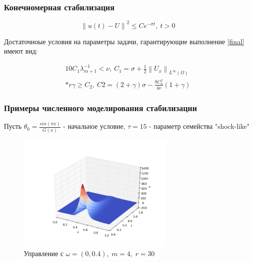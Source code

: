 \documentclass{beamer}
\newcommand{\norm}[1]{\left\lVert#1\right\rVert}
\begin{document}
\begin{frame}
    \frametitle{Конечномерная стабилизация}

    \begin{block}{}
        \begin{equation}\label{final}
            \norm{u(t) - U}^2 \le C e^{-\sigma t}, \ t > 0
        \end{equation}
    \end{block}

    Достаточноые условия на параметры задачи, гарантирующие выполнение \eqref{final}
    имеют вид:

    \begin{block}{}
        \begin{gather*}
            10C_1 \lambda_{m + 1}^{-1} < \nu, \ C_1 = \sigma + \frac{1}{2}
            \norm{U_x}_{L^{\infty}(\Omega)} \\*
            r\gamma \ge C_2, \ C2 = (2 + \gamma)\sigma - \frac{9C_0^2}{4\nu}(1 + \gamma)
        \end{gather*}
    \end{block}

\end{frame}

\begin{frame}
    \frametitle{Примеры численного моделирования стабилизации}

    Пусть $\theta_0 = \frac{sin(\pi x)}{G(x)}$ - начальное условие, $\tau = 15$
    - параметр семейства "shock-like"

    \begin{figure}[H]
        \centering
        \includegraphics[width=3in]{re_s15}
        \caption{Управление с $\omega = (0, 0.4), \; m = 4, \; r = 30$}
        \label{fig:test5}
    \end{figure}

\end{frame}
\end{document}
